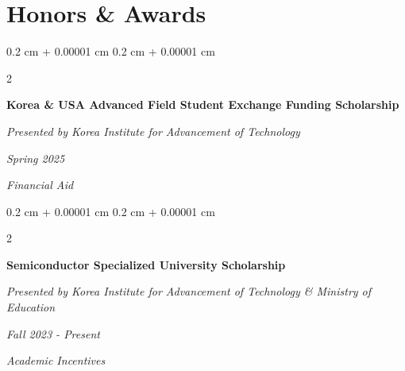 \documentclass[10pt, letterpaper]{article}
\newenvironment{highlights}{
    \begin{itemize}[
        topsep=0.10 cm,
        parsep=0.10 cm,
        partopsep=0pt,
        itemsep=0pt,
        leftmargin=0.4 cm + 10pt
    ]
}{
    \end{itemize}
} %
\newenvironment{onecolentry}{
    \begin{adjustwidth}{
        0.2 cm + 0.00001 cm
    }{
        0.2 cm + 0.00001 cm
    }
}{
    \end{adjustwidth}
} %
\newenvironment{twocolentry}[2][]{
    \onecolentry
    \def\secondColumn{#2}
    \setcolumnwidth{\fill, 4.5 cm}
    \begin{paracol}{2}
}{
    \switchcolumn \raggedleft \secondColumn
    \end{paracol}
    \endonecolentry
} %
\let\hrefWithoutArrow\href
\renewcommand{\href}[2]{\hrefWithoutArrow{#1}{\ifthenelse{\equal{#2}{}}{ }{#2 }\raisebox{.15ex}{\footnotesize \faExternalLink*}}}
\begin{document}
    

            



    \section{Honors \& Awards}

        \begin{twocolentry}{
        \textit{Spring 2025}    
            
        \textit{Financial Aid}}
            \textbf{Korea \& USA Advanced Field Student Exchange Funding Scholarship}
            
            \textit{Presented by Korea Institute for Advancement of Technology}
        \end{twocolentry}
    
        \vspace{0.3 cm}

        \begin{twocolentry}{
        \textit{Fall 2023 - Present}    
            
        \textit{Academic Incentives}}
            \textbf{Semiconductor Specialized University Scholarship}
            
            \textit{Presented by Korea Institute for Advancement of Technology \& Ministry of Education}
        \end{twocolentry}
\end{document}
